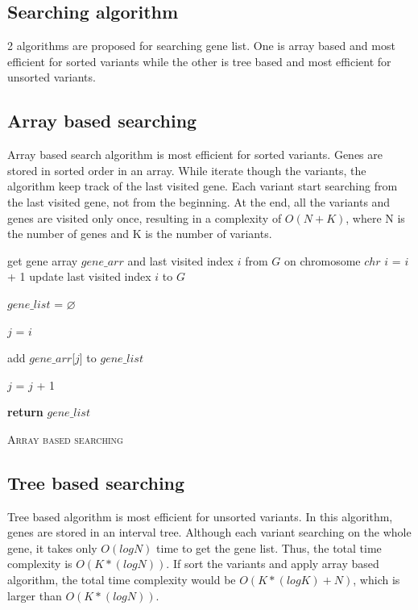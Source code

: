 \documentclass[onehalf,11pt]{beavtex}
\begin{document}
\subsection{Searching algorithm}
2 algorithms are proposed for searching gene list. One is array based and most efficient for sorted variants while the other is tree based and most efficient for unsorted variants.
\subsection{Array based searching}
Array based search algorithm is most efficient for sorted variants. Genes are stored in sorted order in an array. While iterate though the variants, the algorithm keep track of the last visited gene. Each variant start searching from the last visited gene, not from the beginning. At the end, all the variants and genes are visited only once, resulting in a complexity of $O(N + K)$, where N is the number of genes and K is the number of variants.

\IncMargin{1em}
\begin{algorithm}[h!]
 \label{alg:alg_array}
 \SetAlgoLined
\BlankLine	
	get gene array $gene\_arr$ and last visited index $i$ from $G$ on chromosome $chr$
     \BlankLine
      {
     	$i$ = $i$ + 1
     }
	\BlankLine
	update last visited index $i$ to $G$     
     
     $gene\_list$ = $\varnothing$
     
     $j$ = $i$
     \BlankLine
      {
     	add $gene\_arr$[$j$] to $gene\_list$
     	
     	$j$ = $j$ + 1
     }
     \BlankLine
     \textbf{return} $gene\_list$

 \caption{\textsc{Array based searching}}
\end{algorithm}\DecMargin{1em} 


\subsection{Tree based searching}
Tree based algorithm is most efficient for unsorted variants. In this algorithm, genes are stored in an interval tree. Although each variant searching on the whole gene, it takes only $O(log N)$ time to get the gene list. Thus, the total time complexity is $O(K * (log N))$. If sort the variants and apply array based algorithm, the total time complexity would be $O(K * (log K) + N)$, which is larger than $O(K * (log N))$.
\end{document}
